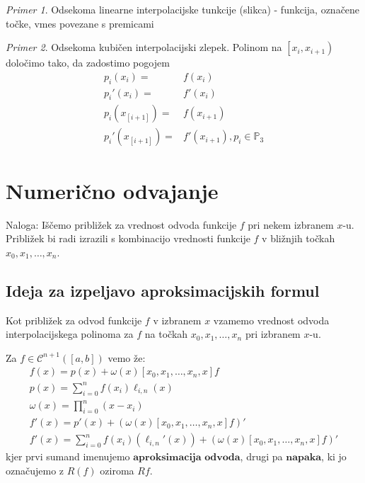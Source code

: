\documentclass[a4paper,12pt]{article}
\theoremstyle{definition}
\theoremstyle{remark}
\newtheorem*{ex}{Primer}
\newcommand{\Pp}{\mathbb{P}}
\begin{document}
\begin{ex}
    Odsekoma linearne interpolacijske tunkcije (slikca) - funkcija, označene točke, vmes povezane s premicami
\end{ex}

\begin{ex}
    Odsekoma kubičen interpolacijski zlepek.
    Polinom na $\left[ x_i, x_{i+1}\right)$ določimo tako, da zadostimo pogojem
    \begin{align*}
        p_i(x_i) =& f(x_i) \\
        p_i'(x_i) =& f'(x_i) \\
        p_i(x_[i+1]) =& f(x_{i+1}) \\
        p_i'(x_[i+1]) =& f'(x_{i+1}), p_i \in \Pp_3
    \end{align*}
\end{ex}



\section{Numerično odvajanje}

Naloga: Iščemo približek za vrednost odvoda funkcije $f$ pri nekem izbranem $x$-u. Približek bi radi izrazili s kombinacijo vrednosti funkcije $f$
v bližnjih točkah $x_0, x_1, \dots, x_n$.

\subsection{Ideja za izpeljavo aproksimacijskih formul}
Kot približek za odvod funkcije $f$ v izbranem $x$ vzamemo vrednost odvoda interpolacijskega polinoma za $f$ na točkah $x_0, x_1, \dots, x_n$ pri
izbranem $x$-u.

Za $f \in \mathscr{C}^{n+1} ([a, b])$ vemo že:
\begin{gather*}
    f(x) = p(x) + \omega(x)[x_0, x_1, \dots, x_n, x] f \\
    p(x) = \sum_{i = 0}^{n} f(x_i) \ell_{i, n}(x) \\
    \omega(x) = \prod_{i=0}^{n}(x-x_i) \\
    f'(x) = p'(x) + (\omega(x)[x_0, x_1, \dots, x_n, x] f)' \\
    f'(x) = \sum_{i=0}^{n}f(x_i) (\ell_{i,n}'(x)) + (\omega(x)[x_0, x_1, \dots, x_n, x] f)'
\end{gather*}
kjer prvi sumand imenujemo $\textbf{aproksimacija odvoda}$, drugi pa $\textbf{napaka}$, ki jo
označujemo z $R(f)$ oziroma $Rf$.
\end{document}
